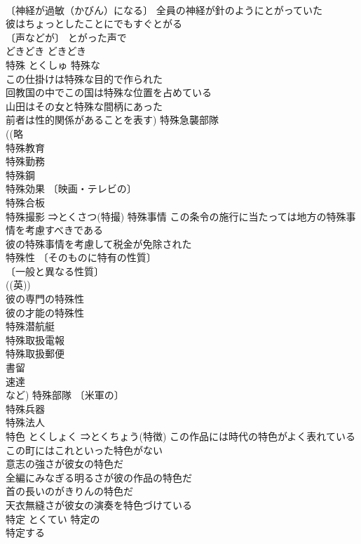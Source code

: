 \documentclass[8pt]{extreport}
\begin{document}
\begin{CJK}{UTF8}{min}
\\	〔神経が過敏（かびん）になる〕 全員の神経が針のようにとがっていた 
\\	彼はちょっとしたことにでもすぐとがる 
\\	〔声などが〕 とがった声で 
\\	どきどき	どきどき	
\\	特殊	とくしゅ	特殊な 
\\	この仕掛けは特殊な目的で作られた 
\\	回教国の中でこの国は特殊な位置を占めている 
\\	山田はその女と特殊な間柄にあった 
\\	前者は性的関係があることを表す) 特殊急襲部隊 
\\	((略
\\	特殊教育 
\\	特殊勤務 
\\	特殊鋼 
\\	特殊効果 〔映画・テレビの〕
\\	特殊合板 
\\	特殊撮影 ⇒とくさつ(特撮) 特殊事情 この条令の施行に当たっては地方の特殊事情を考慮すべきである 
\\	彼の特殊事情を考慮して税金が免除された 
\\	特殊性 〔そのものに特有の性質〕
\\	〔一般と異なる性質〕
\\	((英)) 
\\	彼の専門の特殊性 
\\	彼の才能の特殊性 
\\	特殊潜航艇 
\\	特殊取扱電報 
\\	特殊取扱郵便 
\\	書留
\\	速達
\\	など) 特殊部隊 〔米軍の〕
\\	特殊兵器 
\\	特殊法人 
\\	特色	とくしょく	⇒とくちょう(特徴) この作品には時代の特色がよく表れている 
\\	この町にはこれといった特色がない 
\\	意志の強さが彼女の特色だ 
\\	全編にみなぎる明るさが彼の作品の特色だ 
\\	首の長いのがきりんの特色だ 
\\	天衣無縫さが彼女の演奏を特色づけている 
\\	特定	とくてい	特定の 
\\	特定する 

\end{CJK}
\end{document}
